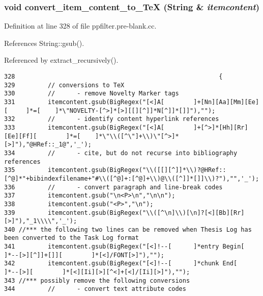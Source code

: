 \subsubsection{\setlength{\rightskip}{0pt plus 5cm}void convert\_\-item\_\-content\_\-to\_\-Te\-X ({\bf String} \& {\em itemcontent})}\label{ppfilter_8pre-blank_8cc_a11}




Definition at line 328 of file ppfilter.pre-blank.cc.

References String::gsub().

Referenced by extract\_\-recursively().



\footnotesize\begin{verbatim}328                                                        {
329         // conversions to TeX
330         //      - remove Novelty Marker tags
331         itemcontent.gsub(BigRegex("[<]A[        ]+[Nn][Aa][Mm][Ee][     ]*=[    ]*\"NOVELTY-[^>]*[>][[][^]]*N[^]]*[]]"),"");
332         //      - identify content hyperlink references
333         itemcontent.gsub(BigRegex("[<]A[        ]+[^>]*[Hh][Rr][Ee][Ff][        ]*=[    ]*\"\\([^\"]+\\)\"[^>]*[>]"),"@HRef::_1@",'_');
334         //      - cite, but do not recurse into bibliography references
335         itemcontent.gsub(BigRegex("\\([[][^]]*\\)?@HRef::[^@]*"+bibindexfilename+"#\\([^@]+:[^@]+\\)@\\([^]]*[]]\\)?"),"",'_');
336         //      - convert paragraph and line-break codes
337         itemcontent.gsub("\n<P>\n","\n\n");
338         itemcontent.gsub("<P>","\n");
339         itemcontent.gsub(BigRegex("\\([^\n]\\)[\n]?[<][Bb][Rr][>]"),"_1\\\\",'_');
340 //*** the following two lines can be removed when Thesis Log has been converted to the Task Log format
341         itemcontent.gsub(BigRegex("[<]!--[      ]*entry Begin[  ]*--[>][^]]+[]][        ]*[<]/FONT[>]"),"");
342         itemcontent.gsub(BigRegex("[<]!--[      ]*chunk End[    ]*--[>][        ]*[<][Ii][>][^<]+[<]/[Ii][>]"),"");
343 //*** possibly remove the following conversions
344         //      - convert text attribute codes

\end{verbatim}
